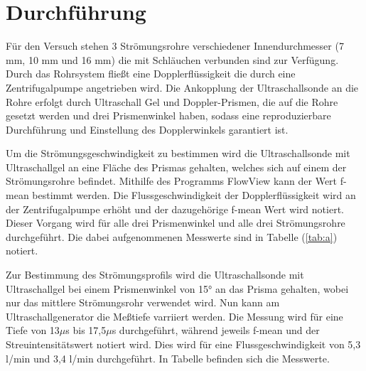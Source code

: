 \section{Durchführung}
Für den Versuch stehen 3 Strömungsrohre verschiedener Innendurchmesser (7 mm, 10 mm und 16 mm) die mit Schläuchen verbunden sind zur Verfügung.
Durch das Rohrsystem fließt eine Dopplerflüssigkeit die durch eine Zentrifugalpumpe angetrieben wird.
Die Ankopplung der Ultraschallsonde an die Rohre erfolgt durch Ultraschall Gel und Doppler-Prismen, die auf die Rohre gesetzt werden
und drei Prismenwinkel haben, sodass eine reproduzierbare Durchführung und Einstellung des Dopplerwinkels garantiert ist.

\noindent
Um die Strömungsgeschwindigkeit zu bestimmen wird die Ultraschallsonde mit Ultraschallgel an eine Fläche des Prismas gehalten, 
welches sich auf einem der Strömungsrohre befindet.
Mithilfe des Programms FlowView kann der Wert f-mean bestimmt werden.
Die Flussgeschwindigkeit der Dopplerflüssigkeit wird an der Zentrifugalpumpe erhöht und der dazugehörige f-mean Wert wird notiert.
Dieser Vorgang wird für alle drei Prismenwinkel und alle drei Strömungsrohre durchgeführt.
Die dabei aufgenommenen Messwerte sind in Tabelle (\ref{tab:a}) notiert.

\noindent
Zur Bestimmung des Strömungsprofils wird die Ultraschallsonde mit Ultraschallgel bei einem Prismenwinkel von 15° an das Prisma gehalten, 
wobei nur das mittlere Strömungsrohr verwendet wird.
Nun kann am Ultraschallgenerator die Meßtiefe varriiert werden.
Die Messung wird für eine Tiefe von 13$\mu$s bis 17,5$\mu$s durchgeführt, 
während jeweils f-mean und der Streuintensitätswert notiert wird.
Dies wird für eine Flussgeschwindigkeit von 5,3 l/min und 3,4 l/min durchgeführt.
In Tabelle %
befinden sich die Messwerte.
